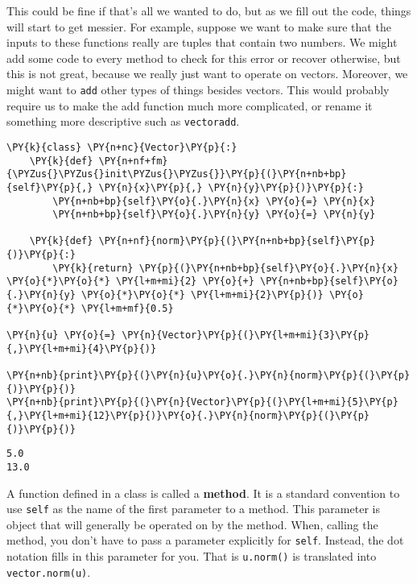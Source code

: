 This could be fine if that's all we wanted to do, but as we fill out the code, things will start to get messier.  For example, suppose we want to make sure that the inputs to these functions really are tuples that contain two numbers.  We might add some code to every method to check for this error or recover otherwise, but this is not great, because we really just want to operate on vectors.  Moreover, we might want to \texttt{add} other types of things besides vectors.  This would probably require us to make the add function much more complicated, or rename it something more descriptive such as \texttt{vectoradd}.


\begin{Verbatim}[commandchars=\\\{\}]
\PY{k}{class} \PY{n+nc}{Vector}\PY{p}{:}
    \PY{k}{def} \PY{n+nf+fm}{\PYZus{}\PYZus{}init\PYZus{}\PYZus{}}\PY{p}{(}\PY{n+nb+bp}{self}\PY{p}{,} \PY{n}{x}\PY{p}{,} \PY{n}{y}\PY{p}{)}\PY{p}{:}
        \PY{n+nb+bp}{self}\PY{o}{.}\PY{n}{x} \PY{o}{=} \PY{n}{x}
        \PY{n+nb+bp}{self}\PY{o}{.}\PY{n}{y} \PY{o}{=} \PY{n}{y}

    \PY{k}{def} \PY{n+nf}{norm}\PY{p}{(}\PY{n+nb+bp}{self}\PY{p}{)}\PY{p}{:}
        \PY{k}{return} \PY{p}{(}\PY{n+nb+bp}{self}\PY{o}{.}\PY{n}{x} \PY{o}{*}\PY{o}{*} \PY{l+m+mi}{2} \PY{o}{+} \PY{n+nb+bp}{self}\PY{o}{.}\PY{n}{y} \PY{o}{*}\PY{o}{*} \PY{l+m+mi}{2}\PY{p}{)} \PY{o}{*}\PY{o}{*} \PY{l+m+mf}{0.5}

\PY{n}{u} \PY{o}{=} \PY{n}{Vector}\PY{p}{(}\PY{l+m+mi}{3}\PY{p}{,}\PY{l+m+mi}{4}\PY{p}{)}

\PY{n+nb}{print}\PY{p}{(}\PY{n}{u}\PY{o}{.}\PY{n}{norm}\PY{p}{(}\PY{p}{)}\PY{p}{)}
\PY{n+nb}{print}\PY{p}{(}\PY{n}{Vector}\PY{p}{(}\PY{l+m+mi}{5}\PY{p}{,}\PY{l+m+mi}{12}\PY{p}{)}\PY{o}{.}\PY{n}{norm}\PY{p}{(}\PY{p}{)}\PY{p}{)}
\end{Verbatim}

\begin{Verbatim}
5.0
13.0

\end{Verbatim}


A function defined in a class is called a \textbf{method}.  It is a standard convention to use \texttt{self} as the name of the first parameter to a method.  This parameter is object that will generally be operated on by the method.  When, calling the method, you don't have to pass a parameter explicitly for \texttt{self}.  Instead, the dot notation fills in this parameter for you.  That is \texttt{u.norm()} is translated into \texttt{vector.norm(u)}.  


